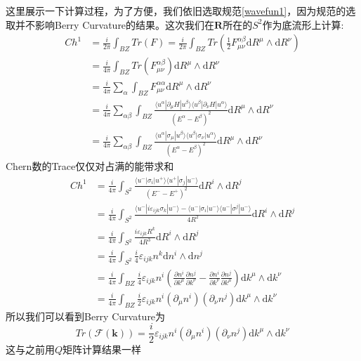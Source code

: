 \documentclass[a4paper]{article}
\numberwithin{equation}{subsection}
\begin{document}
这里展示一下计算过程，为了方便，我们依旧选取规范\eqref{wavefun1}，因为规范的选取并不影响Berry Curvature的结果。这次我们在$\mathbf{R}$所在的$S^2$作为底流形上计算:
\begin{equation}
    \begin{split}
        Ch^1&=\frac{i}{2\pi}\int_{BZ}Tr(F)=\frac{i}{2\pi}\int_{BZ}Tr(\frac{1}{2}F_{\mu\nu}^{\alpha\beta}\mathrm{d}R^\mu\wedge\mathrm{d}R^{\nu})\\
        &=\frac{i}{4\pi}\int_{BZ}Tr(F_{\mu\nu}^{\alpha\beta})\mathrm{d}R^\mu\wedge\mathrm{d}R^\nu\\
        &=\frac{i}{4\pi}\sum_{\alpha}\int_{BZ}F_{\mu\nu}^{\alpha\alpha}\mathrm{d}R^\mu\wedge\mathrm{d}R^\nu\\
        &=\frac{i}{4\pi}\sum_{\alpha\beta}\int_{BZ}\frac{\langle u^\alpha|\partial_\mu H|u^\beta\rangle\langle u^\beta|\partial_\nu H|u^\alpha\rangle}{(E^\alpha-E^\beta)^2}\mathrm{d}R^\mu\wedge\mathrm{d}R^\nu\\
        &=\frac{i}{4\pi}\sum_{\alpha\beta}\int_{BZ}\frac{\langle u^\alpha|\sigma_\mu|u^\beta\rangle\langle u^\beta|\sigma_\nu|u^\alpha\rangle}{(E^\alpha-E^\beta)^2}\mathrm{d}R^\mu\wedge\mathrm{d}R^\nu
    \end{split}
\end{equation}
Chern数的Trace仅仅对占满的能带求和
\begin{equation}
    \begin{split}
        Ch^1&=\frac{i}{4\pi}\int_{S^2}\frac{\langle u^-|\sigma_i|u^+\rangle\langle u^+|\sigma_j|u^-\rangle}{(E^--E^+)^2}\mathrm{d}R^i\wedge\mathrm{d}R^j\\
        &=\frac{i}{4\pi}\int_{S^2}\frac{\langle u^-|i\varepsilon_{ijk}\sigma_k|u^-\rangle-\langle u^-|\sigma_i|u^-\rangle\langle u^-|\sigma^j|u^-\rangle}{4R^2}\mathrm{d}R^i\wedge\mathrm{d}R^j\\
        &=\frac{i}{4\pi}\int_{S^2}\frac{i\varepsilon_{ijk}R^k}{4R^3}\mathrm{d}R^i\wedge\mathrm{d}R^j\\
        &=\frac{i}{4\pi}\int_{S^2}\frac{i}{4}\varepsilon_{ijk}n^k\mathrm{d}n^i\wedge\mathrm{d}n^j\\
        &=\frac{i}{4\pi}\int_{BZ}\frac{i}{4}\varepsilon_{ijk}n^i(\frac{\partial n^i}{\partial k^\mu}\frac{\partial n^j}{\partial k^\nu}-\frac{\partial n^i}{\partial k^\nu}\frac{\partial n^j}{\partial k^\mu})\mathrm{d}k^\mu\wedge\mathrm{d}k^\nu\\
        &=\frac{i}{4\pi}\int_{BZ}\frac{i}{2}\varepsilon_{ijk}n^i(\partial_\mu n^i)(\partial_\nu n^j)\mathrm{d}k^\mu\wedge\mathrm{d}k^\nu
    \end{split}
\end{equation}
所以我们可以看到Berry Curvature为
\begin{equation}
    Tr(\mathcal{F}(\mathbf{k}))=\frac{i}{2}\varepsilon_{ijk}n^i(\partial_\mu n^i)(\partial_\nu n^j)\mathrm{d}k^\mu\wedge\mathrm{d}k^\nu
\end{equation}
这与之前用$Q$矩阵计算结果一样
\end{document}

